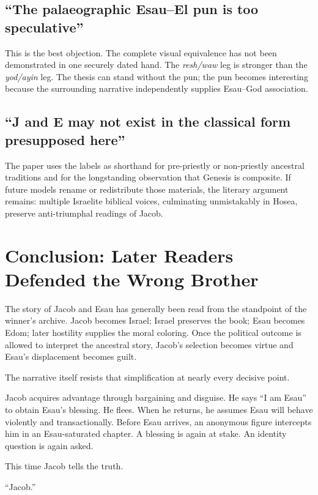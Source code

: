 \subsection{``The palaeographic Esau--El pun is too speculative''}

This is the best objection. The complete visual equivalence has not been demonstrated in one securely dated hand. The \emph{resh/waw} leg is stronger than the \emph{yod/ayin} leg. The thesis can stand without the pun; the pun becomes interesting because the surrounding narrative independently supplies Esau--God association.

\subsection{``J and E may not exist in the classical form presupposed here''}

The paper uses the labels as shorthand for pre-priestly or non-priestly ancestral traditions and for the longstanding observation that Genesis is composite. If future models rename or redistribute those materials, the literary argument remains: multiple Israelite biblical voices, culminating unmistakably in Hosea, preserve anti-triumphal readings of Jacob.

\section{Conclusion: Later Readers Defended the Wrong Brother}

The story of Jacob and Esau has generally been read from the standpoint of the winner's archive. Jacob becomes Israel; Israel preserves the book; Esau becomes Edom; later hostility supplies the moral coloring. Once the political outcome is allowed to interpret the ancestral story, Jacob's selection becomes virtue and Esau's displacement becomes guilt.

The narrative itself resists that simplification at nearly every decisive point.

Jacob acquires advantage through bargaining and disguise. He says ``I am Esau'' to obtain Esau's blessing. He flees. When he returns, he assumes Esau will behave violently and transactionally. Before Esau arrives, an anonymous figure intercepts him in an Esau-saturated chapter. A blessing is again at stake. An identity question is again asked.

This time Jacob tells the truth.

``Jacob.''

